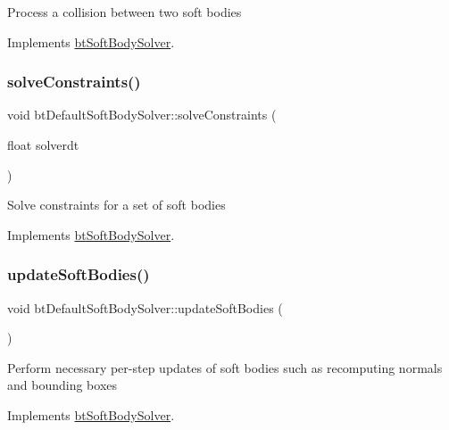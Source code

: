 Process a collision between two soft bodies 

Implements \hyperlink{classbtSoftBodySolver_a08f03a574f0936d834ff100f87755ea6}{bt\+Soft\+Body\+Solver}.

\mbox{\label{classbtDefaultSoftBodySolver_a039cf1be486f6493be0983df3f4f1fbf}} 
\subsubsection{\texorpdfstring{solve\+Constraints()}{solveConstraints()}}
{\footnotesize\ttfamily void bt\+Default\+Soft\+Body\+Solver\+::solve\+Constraints (\begin{DoxyParamCaption}\item[{float}]{solverdt }\end{DoxyParamCaption})\hspace{0.3cm}{\ttfamily [virtual]}}

Solve constraints for a set of soft bodies 

Implements \hyperlink{classbtSoftBodySolver_a5e71a2a32786574bedf409ba822980eb}{bt\+Soft\+Body\+Solver}.

\mbox{\label{classbtDefaultSoftBodySolver_a28c27dd170396900b6e79379d5781610}} 
\subsubsection{\texorpdfstring{update\+Soft\+Bodies()}{updateSoftBodies()}}
{\footnotesize\ttfamily void bt\+Default\+Soft\+Body\+Solver\+::update\+Soft\+Bodies (\begin{DoxyParamCaption}{ }\end{DoxyParamCaption})\hspace{0.3cm}{\ttfamily [virtual]}}

Perform necessary per-\/step updates of soft bodies such as recomputing normals and bounding boxes 

Implements \hyperlink{classbtSoftBodySolver_adac4b4f20eee46dc4fab26ed25be89ef}{bt\+Soft\+Body\+Solver}.



